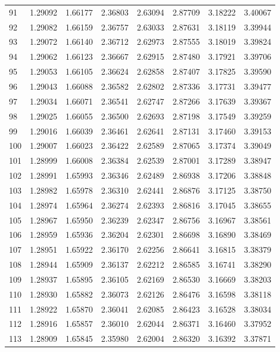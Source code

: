 \begin{tabular}{lrrrrrrr}
91 & 1.29092 & 1.66177 & 2.36803 & 2.63094 & 2.87709 & 3.18222 & 3.40067 \\
92 & 1.29082 & 1.66159 & 2.36757 & 2.63033 & 2.87631 & 3.18119 & 3.39944 \\
93 & 1.29072 & 1.66140 & 2.36712 & 2.62973 & 2.87555 & 3.18019 & 3.39824 \\
94 & 1.29062 & 1.66123 & 2.36667 & 2.62915 & 2.87480 & 3.17921 & 3.39706 \\
95 & 1.29053 & 1.66105 & 2.36624 & 2.62858 & 2.87407 & 3.17825 & 3.39590 \\
96 & 1.29043 & 1.66088 & 2.36582 & 2.62802 & 2.87336 & 3.17731 & 3.39477 \\
97 & 1.29034 & 1.66071 & 2.36541 & 2.62747 & 2.87266 & 3.17639 & 3.39367 \\
98 & 1.29025 & 1.66055 & 2.36500 & 2.62693 & 2.87198 & 3.17549 & 3.39259 \\
99 & 1.29016 & 1.66039 & 2.36461 & 2.62641 & 2.87131 & 3.17460 & 3.39153 \\
100 & 1.29007 & 1.66023 & 2.36422 & 2.62589 & 2.87065 & 3.17374 & 3.39049 \\
101 & 1.28999 & 1.66008 & 2.36384 & 2.62539 & 2.87001 & 3.17289 & 3.38947 \\
102 & 1.28991 & 1.65993 & 2.36346 & 2.62489 & 2.86938 & 3.17206 & 3.38848 \\
103 & 1.28982 & 1.65978 & 2.36310 & 2.62441 & 2.86876 & 3.17125 & 3.38750 \\
104 & 1.28974 & 1.65964 & 2.36274 & 2.62393 & 2.86816 & 3.17045 & 3.38655 \\
105 & 1.28967 & 1.65950 & 2.36239 & 2.62347 & 2.86756 & 3.16967 & 3.38561 \\
106 & 1.28959 & 1.65936 & 2.36204 & 2.62301 & 2.86698 & 3.16890 & 3.38469 \\
107 & 1.28951 & 1.65922 & 2.36170 & 2.62256 & 2.86641 & 3.16815 & 3.38379 \\
108 & 1.28944 & 1.65909 & 2.36137 & 2.62212 & 2.86585 & 3.16741 & 3.38290 \\
109 & 1.28937 & 1.65895 & 2.36105 & 2.62169 & 2.86530 & 3.16669 & 3.38203 \\
110 & 1.28930 & 1.65882 & 2.36073 & 2.62126 & 2.86476 & 3.16598 & 3.38118 \\
111 & 1.28922 & 1.65870 & 2.36041 & 2.62085 & 2.86423 & 3.16528 & 3.38034 \\
112 & 1.28916 & 1.65857 & 2.36010 & 2.62044 & 2.86371 & 3.16460 & 3.37952 \\
113 & 1.28909 & 1.65845 & 2.35980 & 2.62004 & 2.86320 & 3.16392 & 3.37871 \\

\end{tabular}
